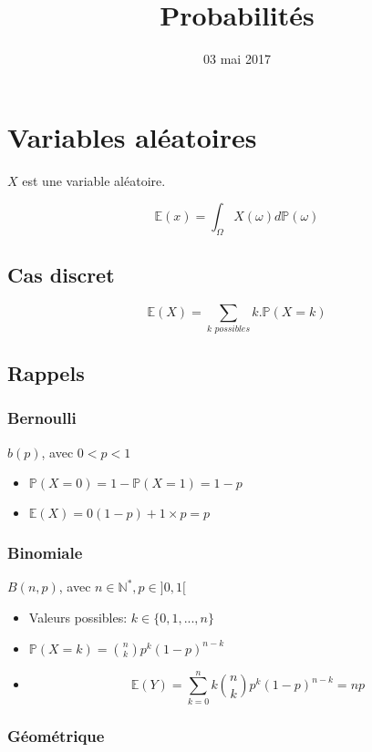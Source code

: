 \documentclass{article}
\title{Probabilités}
\date{03 mai 2017}
\begin{document}
\maketitle

\section{Variables aléatoires}
$X$ est une variable aléatoire.

$$\mathbb{E}(x) = \int_{\Omega} X(\omega) d\mathbb{P}(\omega)$$

\subsection{Cas discret}
\[
  \mathbb{E}(X)=\sum_{\textit{k possibles}} k.\mathbb{P}(X=k)
\]

\subsection{Rappels}
\subsubsection{Bernoulli}

$b(p)$, avec $0<p<1$
  \begin{itemize}
    \item $\mathbb{P}(X=0) = 1-\mathbb{P}(X=1)=1-p$
    \item $\mathbb{E}(X)=0(1-p)+1 \times p = p$
  \end{itemize}

\subsubsection{Binomiale}

$B(n,p)$, avec $n \in \mathbb{N}^{*}, p \in ] 0,1 [$
  \begin{itemize}
    \item Valeurs possibles: $k \in \{0,1,...,n\}$
    \item $\mathbb{P}(X=k) = \binom{n}{k} p^k (1-p)^{n-k}$
    \item $$\mathbb{E}(Y) = \sum_{k=0}^n k \binom{n}{k} p^k(1-p)^{n-k} = np$$
  \end{itemize}

\subsubsection{Géométrique}
\end{document}
